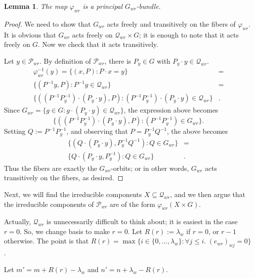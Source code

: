 \documentclass[12pt,psamsfonts]{article}
\newtheorem{lemma}[theorem]{Lemma}
\begin{document}
\begin{lemma}\label{principal_bundle}
    The map \(\varphi_{wr}\) is a principal \(G_{wr}\)-bundle.
\end{lemma}
\begin{proof}
    We need to show that \(G_{wr}\) acts freely and transitively on the fibers of \(\varphi_{wr}\).
    It is obvious that \(G_{wr}\) acts freely on \(\mathcal{Q}_{wr} \times G\); it is enough to note that it acts freely on \(G\).
    Now we check that it acts transitively.
    \par Let \(y \in \mathcal{P}_{wr}\).
    By definition of \(\mathcal{P}_{wr}\), there is \(P_y \in G\) with \(P_y \cdot y \in \mathcal{Q}_{wr}\).
    \begin{align*}
        \varphi_{wr}^{-1}(y) = \{(x, P) : P \cdot x = y \} & = \\
        \{(P^{-1} y, P) : P^{-1} y \in \mathcal{Q}_{wr} \} & = \\
        \{((P^{-1}P_y^{-1}) \cdot (P_y \cdot y), P) : (P^{-1} P_y^{-1}) \cdot (P_y \cdot y) \in \mathcal{Q}_{wr}\} & .
    \end{align*}
    Since \(G_{wr} = \{g \in G : g \cdot (P_y \cdot y) \in \mathcal{Q}_{wr}\}\), the expression above becomes
    \[\{((P^{-1}P_y^{-1}) \cdot (P_y \cdot y), P) : (P^{-1} P_y^{-1}) \in G_{wr}\}.\]
    Setting \(Q := P^{-1} P_y^{-1}\), and observing that \(P = P_y^{-1} Q^{-1}\), the above becomes
    \begin{align*}
        \{(Q \cdot (P_y \cdot y), P_y^{-1} Q^{-1}) : Q \in G_{wr}\} & = \\
        \{Q \cdot (P_y \cdot y, P_y^{-1}) : Q \in G_{wr}\} & .
    \end{align*}
    Thus the fibers are exactly the \(G_{wr}\)-orbits; or in other words, \(G_{wr}\) acts transitively on the fibers, as desired.
\end{proof}
Next, we will find the irreducible components \(X \subseteq \mathcal{Q}_{wr}\), and we then argue that the irreducible components of \(\mathcal{P}_{wr}\) are of the form \(\varphi_{wr}(X \times G)\).
\par Actually, \(\mathcal{Q}_{wr}\) is unnecessarily difficult to think about; it is easiest in the case \(r = 0\).
So, we change basis to make \(r = 0\).
Let \(R(r) := \lambda_w\) if \(r = 0\), or \(r - 1\) otherwise.
The point is that \(R(r) = \max\{i \in \{0, ..., \lambda_w\} : \forall j \leq i. \; (e_{wr})_{wj} = 0\}\).
\par Let \(m' = m + R(r) - \lambda_w\) and \(n' = n + \lambda_w - R(r)\).
\end{document}
